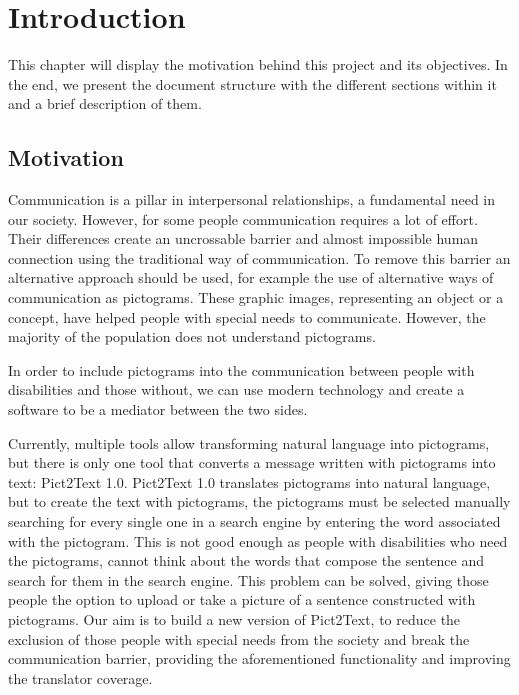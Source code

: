 
\chapter{Introduction}
\label{cap:introduction}

This chapter will display the motivation behind this project and its objectives. In the end, we present the document structure with the different sections within it and a brief description of them.

\section{Motivation}
Communication is a pillar in interpersonal relationships, a fundamental need in our society. However, for some people communication requires a lot of effort. Their differences create an uncrossable barrier and almost impossible human connection using the traditional way of communication. To remove this barrier an alternative approach should be used, for example the use of alternative ways of communication as pictograms. These graphic images, representing an object or a concept, have helped people with special needs to communicate. However, the majority of the population does not understand pictograms.

In order to include pictograms into the communication between people with disabilities and those without, we can use modern technology and create a software to be a mediator between the two sides.

Currently, multiple tools allow transforming natural language into pictograms, but there is only one tool that converts a message written with pictograms into text: Pict2Text 1.0. Pict2Text 1.0 translates pictograms into natural language, but to create the text with pictograms, the pictograms must be selected manually searching for every single one in a search engine by entering the word associated with the pictogram. This is not good enough as people with disabilities who need the pictograms, cannot think about the words that compose the sentence and search for them in the search engine. This problem can be solved, giving those people the option to upload or take a picture of a sentence constructed with pictograms. Our aim is to build a new version of Pict2Text, to reduce the exclusion of those people with special needs from the society and break the communication barrier, providing the aforementioned functionality and improving the translator coverage.

